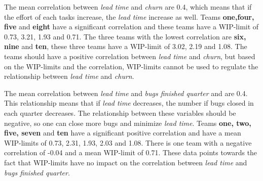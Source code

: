 \documentclass[UKenglish]{ifimaster}  %
\begin{document}
The mean correlation between \textit{lead time} and \textit{churn} are 0.4, which means that if the effort of each tasks increase, the \textit{lead time} increase as well. Teams \textbf{one,four, five} and \textbf{eight} have a significant correlation and these teams have a WIP-limit of 0.73, 3.21, 1.93 and 0.71. The three teams with the lowest correlation are \textbf{six, nine} and \textbf{ten}, these three teams have a WIP-limit of 3.02, 2.19 and 1.08. The teams should have a positive correlation between  \textit{lead time} and \textit{churn}, but based on the WIP-limits and the correlation, WIP-limits cannot be used to regulate the relationship between  \textit{lead time} and \textit{churn}.

The mean correlation between \textit{lead time} and  \textit{bugs finished quarter} and are 0.4. This relationship means that if \textit{lead time} decreases, the number if bugs closed in each quarter decreases. The relationship between these variables should be negative, so one can close more bugs and minimize \textit{lead time}. Teams \textbf{one, two, five, seven} and \textbf{ten} have a significant positive correlation and have a mean WIP-limits of 0.73, 2.31, 1.93, 2.03 and 1.08. There is one team with a negative correlation of -0.04 and a mean WIP-limit of 0.71. These data points towards the fact that WIP-limits have no impact on the correlation between \textit{lead time} and \textit{bugs finished quarter}.






\end{document}

